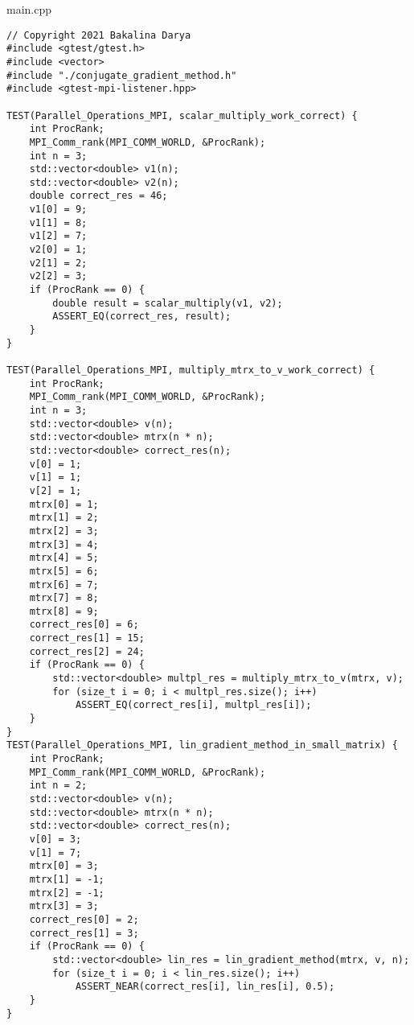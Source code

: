\documentclass{report}
\begin{document}
main.cpp
\begin{lstlisting}
// Copyright 2021 Bakalina Darya
#include <gtest/gtest.h>
#include <vector>
#include "./conjugate_gradient_method.h"
#include <gtest-mpi-listener.hpp>

TEST(Parallel_Operations_MPI, scalar_multiply_work_correct) {
    int ProcRank;
    MPI_Comm_rank(MPI_COMM_WORLD, &ProcRank);
    int n = 3;
    std::vector<double> v1(n);
    std::vector<double> v2(n);
    double correct_res = 46;
    v1[0] = 9;
    v1[1] = 8;
    v1[2] = 7;
    v2[0] = 1;
    v2[1] = 2;
    v2[2] = 3;
    if (ProcRank == 0) {
        double result = scalar_multiply(v1, v2);
        ASSERT_EQ(correct_res, result);
    }
}

TEST(Parallel_Operations_MPI, multiply_mtrx_to_v_work_correct) {
    int ProcRank;
    MPI_Comm_rank(MPI_COMM_WORLD, &ProcRank);
    int n = 3;
    std::vector<double> v(n);
    std::vector<double> mtrx(n * n);
    std::vector<double> correct_res(n);
    v[0] = 1;
    v[1] = 1;
    v[2] = 1;
    mtrx[0] = 1;
    mtrx[1] = 2;
    mtrx[2] = 3;
    mtrx[3] = 4;
    mtrx[4] = 5;
    mtrx[5] = 6;
    mtrx[6] = 7;
    mtrx[7] = 8;
    mtrx[8] = 9;
    correct_res[0] = 6;
    correct_res[1] = 15;
    correct_res[2] = 24;
    if (ProcRank == 0) {
        std::vector<double> multpl_res = multiply_mtrx_to_v(mtrx, v);
        for (size_t i = 0; i < multpl_res.size(); i++)
            ASSERT_EQ(correct_res[i], multpl_res[i]);
    }
}
TEST(Parallel_Operations_MPI, lin_gradient_method_in_small_matrix) {
    int ProcRank;
    MPI_Comm_rank(MPI_COMM_WORLD, &ProcRank);
    int n = 2;
    std::vector<double> v(n);
    std::vector<double> mtrx(n * n);
    std::vector<double> correct_res(n);
    v[0] = 3;
    v[1] = 7;
    mtrx[0] = 3;
    mtrx[1] = -1;
    mtrx[2] = -1;
    mtrx[3] = 3;
    correct_res[0] = 2;
    correct_res[1] = 3;
    if (ProcRank == 0) {
        std::vector<double> lin_res = lin_gradient_method(mtrx, v, n);
        for (size_t i = 0; i < lin_res.size(); i++)
            ASSERT_NEAR(correct_res[i], lin_res[i], 0.5);
    }
}


\end{lstlisting}
\end{document}
